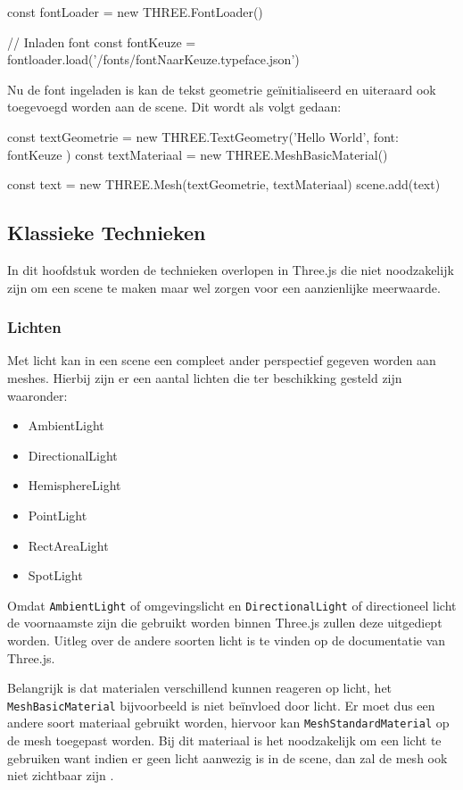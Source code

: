 \begin{LVerbatim}
const fontLoader = new THREE.FontLoader()

// Inladen font
const fontKeuze = fontloader.load('/fonts/fontNaarKeuze.typeface.json')
\end{LVerbatim}

Nu de font ingeladen is kan de tekst geometrie geïnitialiseerd en uiteraard ook toegevoegd worden aan de scene. Dit wordt als volgt gedaan:

\begin{LVerbatim}
const textGeometrie = new THREE.TextGeometry('Hello World', { font: fontKeuze })
const textMateriaal = new THREE.MeshBasicMaterial()

const text = new THREE.Mesh(textGeometrie, textMateriaal)
scene.add(text)
\end{LVerbatim}

\subsection{Klassieke Technieken}

In dit hoofdstuk worden de technieken overlopen in Three.js die niet noodzakelijk zijn om een scene te maken maar wel zorgen voor een aanzienlijke meerwaarde.

\subsubsection{Lichten}

Met licht kan in een scene een compleet ander perspectief gegeven worden aan meshes. Hierbij zijn er een aantal lichten die ter beschikking gesteld zijn waaronder:

\begin{itemize}
	\item AmbientLight
	\item DirectionalLight
	\item HemisphereLight
	\item PointLight
	\item RectAreaLight
	\item SpotLight
\end{itemize}

Omdat \texttt{AmbientLight} of omgevingslicht en \texttt{DirectionalLight} of directioneel licht de voornaamste zijn die gebruikt worden binnen Three.js zullen deze uitgediept worden. Uitleg over de andere soorten licht is te vinden op de documentatie van Three.js.

Belangrijk is dat materialen verschillend kunnen reageren op licht, het \texttt{MeshBasicMaterial} bijvoorbeeld is niet beïnvloed door licht. Er moet dus een andere soort materiaal gebruikt worden, hiervoor kan \texttt{MeshStandardMaterial} op de mesh toegepast worden. Bij dit materiaal is het noodzakelijk om een licht te gebruiken want indien er geen licht aanwezig is in de scene, dan zal de mesh ook niet zichtbaar zijn \autocite{Simon2023}.

